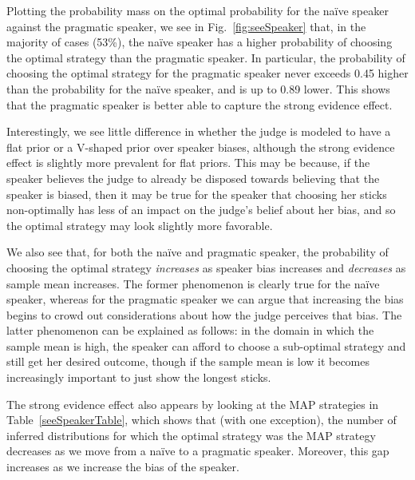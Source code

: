 \documentclass[10pt,letterpaper]{article}
\begin{document}
Plotting the probability mass on the optimal probability for the na\"ive speaker against the pragmatic speaker, we see in Fig.~\ref{fig:seeSpeaker} that,
in the majority of cases (53\%), the na\"ive speaker has a higher probability of choosing the optimal 
strategy than the pragmatic speaker. In particular, the probability of choosing the optimal strategy for the pragmatic speaker never
exceeds 0.45 higher than the probability for the na\"ive speaker, and is up to 0.89 lower. This shows that the 
pragmatic speaker is better able to capture the strong evidence effect.

Interestingly, we see little difference in whether the judge is modeled to have a flat prior or a V-shaped prior over speaker biases,
although the strong evidence effect is slightly more prevalent for flat priors. This may be because, if the speaker believes the judge 
to already be disposed towards believing that the speaker is biased, then it may be true for the speaker that choosing her sticks 
non-optimally has less of an impact on the judge's belief about her bias, and so the optimal strategy may look slightly more 
favorable.

We also see that, for both the na\"ive and pragmatic speaker, the probability of choosing the optimal strategy \textit{increases} as
speaker bias increases and \textit{decreases} as sample mean increases. The former phenomenon is clearly true for the na\"ive speaker,
whereas for the pragmatic speaker we can argue that increasing the bias begins to crowd out considerations about how the judge perceives
that bias. The latter phenomenon can be explained as follows: in the domain in which the sample mean is high, the speaker
can afford to choose a sub-optimal strategy and still get her desired outcome, though if the sample mean is low it becomes 
increasingly important to just show the longest sticks.

The strong evidence effect also appears by looking at the MAP strategies in Table~\ref{seeSpeakerTable}, which shows that (with one exception),
the number of inferred distributions for which the optimal strategy was the MAP strategy decreases as we move from a 
na\"ive to a pragmatic speaker. Moreover, this gap increases as we increase the bias of the speaker.
\end{document}
